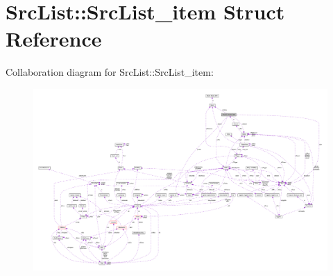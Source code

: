 \hypertarget{struct_src_list_1_1_src_list__item}{\section{Src\-List\-:\-:Src\-List\-\_\-item Struct Reference}
\label{struct_src_list_1_1_src_list__item}
}


Collaboration diagram for Src\-List\-:\-:Src\-List\-\_\-item\-:\nopagebreak
\begin{figure}[H]
\begin{center}
\leavevmode
\includegraphics[width=350pt]{struct_src_list_1_1_src_list__item__coll__graph}
\end{center}
\end{figure}
